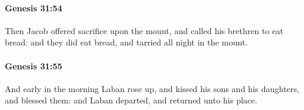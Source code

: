 		\paragraph{Genesis 31:54} %
			\label{GENESIS-31-54}

			Then Jacob offered sacrifice upon the mount, and called his brethren to eat bread: and they did eat bread, and tarried all night in the mount.


		\paragraph{Genesis 31:55} %
			\label{GENESIS-31-55}

			And early in the morning Laban rose up, and kissed his sons and his daughters, and blessed them: and Laban departed, and returned unto his place.

